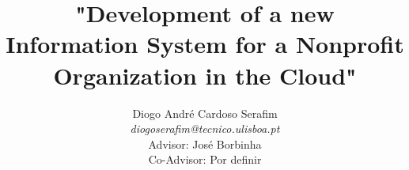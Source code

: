 \documentclass[runningheads,a4paper]{llncs}
\begin{document}


\title{"Development of a new Information System for a Nonprofit Organization in the Cloud"}

\author{Diogo André Cardoso Serafim\\
\textit{diogoserafim@tecnico.ulisboa.pt}
\\Advisor: José Borbinha 
\\Co-Advisor: Por definir}


%
\iffalse
\author{Firstname Lastname\inst{1} \and Firstname Lastname\inst{2} }


\institute{
Insitute 1\\
\email{...}\and
Insitute 2\\
\email{...}
}
\fi
			
\maketitle
\end{document}
